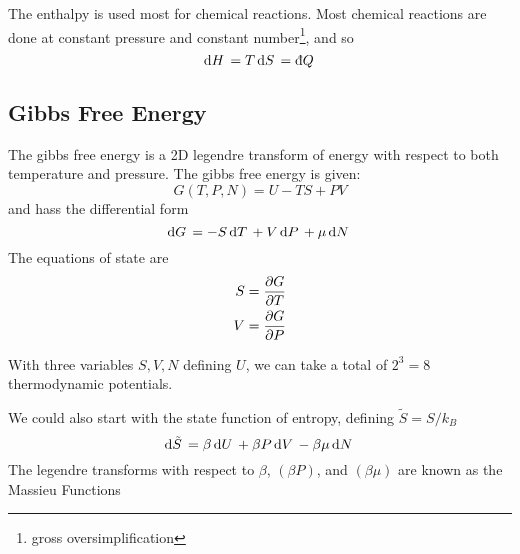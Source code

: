 The enthalpy is used most for chemical reactions. Most chemical reactions are done at constant pressure and constant number\footnote{gross oversimplification}, and so
\[\d{H}=T\d{S}=\dbar{Q}\]

\subsection{Gibbs Free Energy}
The gibbs free energy is a 2D legendre transform of energy with respect to both temperature and pressure. The gibbs free energy is given:
\begin{equation}
	G(T,P,N) = U-TS+PV
\end{equation}
and hass the differential form
\begin{equation}
	\d{G}=-S\d{T}+V\d{P}+\mu\d{N}
\end{equation}
The equations of state are
\begin{subequations}
	\begin{align}
		S&=\frac{\partial G}{\partial T}\\
		V&=\frac{\partial G}{\partial P}
	\end{align}
\end{subequations}

\begin{aside}
	
With three variables \(S,V,N\) defining \(U\), we can take a total of \(2^3=8\) thermodynamic potentials. 

We could also start with the state function of entropy, defining \(\tilde S = S/k_B\)
\[\d{\tilde{S}}=\beta \d{U}+\beta P \d{V} -\beta\mu\d{N}\]
The legendre transforms with respect to \(\beta\), \((\beta P)\), and \((\beta\mu)\) are known as the Massieu Functions
\end{aside}


